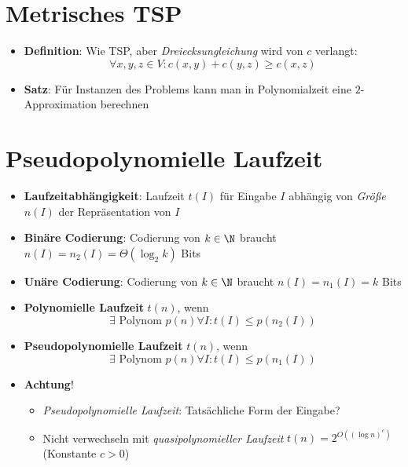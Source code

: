 \section{Metrisches TSP}

\begin{itemize}
  \item \textbf{Definition}: Wie TSP, aber \emph{Dreiecksungleichung} wird von $ c $ verlangt:
  \begin{equation*}
    \forall x, y, z \in V : c(x,y) + c(y,z) \geq c(x,z)
  \end{equation*}
  \item \textbf{Satz}: Für Instanzen des Problems kann man in Polynomialzeit eine $ 2 $-Approximation berechnen
\end{itemize}

\section{Pseudopolynomielle Laufzeit}

\begin{itemize}
  \item \textbf{Laufzeitabhängigkeit}: Laufzeit $ t(I) $ für Eingabe $ I $ abhängig von \emph{Größe} $ n(I) $ der Repräsentation von $ I $
  \item \textbf{Binäre Codierung}: Codierung von $ k \in \N $ braucht $ n(I) = n_2(I) = \Theta(\log_2 k) $ Bits
  \item \textbf{Unäre Codierung}: Codierung von $ k \in \N $ braucht $ n(I) = n_1(I) = k $ Bits
  \item \textbf{Polynomielle Laufzeit} $ t(n) $, wenn
    \begin{equation*}
      \exists \text{ Polynom } p(n) \forall I : t(I) \leq p(n_2(I))
    \end{equation*}
  \item \textbf{Pseudopolynomielle Laufzeit} $ t(n) $, wenn
    \begin{equation*}
      \exists \text{ Polynom } p(n) \forall I : t(I) \leq p(n_1(I))
    \end{equation*}
  \item \textbf{Achtung}!
  \begin{itemize}
    \item \emph{Pseudopolynomielle Laufzeit}: Tatsächliche Form der Eingabe? 
    \item Nicht verwechseln mit \emph{quasipolynomieller Laufzeit} $ t(n) = 2^{O((\log n)^c)} $ (Konstante $ c > 0 $)
  \end{itemize}
\end{itemize}

